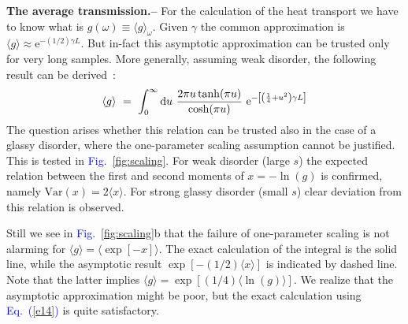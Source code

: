 \documentclass[onecolumn,fleqn,notitlepage,secnumarabic]{revtex4}
\newcommand{\Eq}[1]{\textcolor{blue}{Eq.\!\!~(\ref{#1})}}
\newcommand{\Fig}[1]{\textcolor{blue}{Fig.}\!\!~\ref{#1}}
\newcommand{\eexp}{\mbox{e}^}
\newcommand{\be}[1]{\begin{eqnarray}\ifthenelse{#1=-1}{\nonumber}{\ifthenelse{#1=0}{}{\label{e#1}}}}
\newcommand{\ee}{\end{eqnarray}}
\newcommand{\eeq}{\ee}
\newcommand{\sect}[1]{{\bf #1.-- }}
\begin{document}
\sect{The average transmission}
%
For the calculation of the heat transport we have to know 
what is  ${ g(\omega) \equiv \langle g \rangle_{\omega} }$. 
Given $\gamma$ the common approximation 
is ${ \langle g \rangle \approx \eexp{-(1/2)\gamma L}}$.
But in-fact this asymptotic approximation can be trusted 
only for very long samples. More generally, assuming weak disorder, 
the following result can be derived~\cite{Abrikosov,Shapiro,Izrailev}:
%
\be{14}
\langle g \rangle \ = \ 
\int_0^\infty\mathrm{d} u
\ \frac{2\pi u\tanh(\pi u)}{\cosh(\pi u)}
\ \mathrm{e}^{-\left[\left(\frac{1}{4}+u^2\right)\gamma L\right]}
\label{gabrik}
\eeq
%
The question arises whether this relation can be trusted 
also in the case of a glassy disorder, where the 
one-parameter scaling assumption cannot be justified.
%
This is tested in \Fig{fig:scaling}. For weak disorder (large $s$) 
the expected relation between the first and second moments 
of $x=-\ln(g)$ is confirmed, namely ${\text{Var}(x)=2\langle x \rangle}$.
For strong glassy disorder (small $s$) clear deviation 
from this relation is observed. 

Still we see in \Fig{fig:scaling}b that the failure of one-parameter scaling 
is not alarming for $\langle g \rangle = \langle \exp[-x] \rangle$.
The exact calculation of the integral is the solid line,
while the asymptotic result $\exp[-(1/2)\langle x \rangle]$ 
is indicated by dashed line. Note that the latter 
implies ${\langle g \rangle = \exp[(1/4)\langle\ln(g)\rangle]}$. 
We realize that the asymptotic approximation might be poor, 
but the exact calculation using \Eq{e14} is quite satisfactory. 
\end{document}
